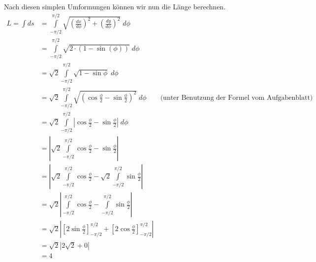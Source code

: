 \documentclass[a4paper,german,12pt,smallheadings]{scrartcl}
\begin{document}
\begin{enumerate}[a)]
    Nach diesen simplen Umformungen können wir nun die Länge berechnen.
    \begin{align*}
      L = \int ds &= \int\limits_{-\pi/2}^{\pi/2} \sqrt{\left(\frac{dx}{d\phi}\right)^2 + \left(\frac{dy}{d\phi}\right)^2} \; d\phi \\
              &= \int\limits_{-\pi/2}^{\pi/2} \sqrt{2\cdot(1- \sin(\phi))} \; d\phi \\
              &= \sqrt{2} \int\limits_{-\pi/2}^{\pi/2} \sqrt{1- \sin \phi} \; d\phi \\
              &= \sqrt{2} \int\limits_{-\pi/2}^{\pi/2} \sqrt{\left(\cos\frac{\phi}{2} - \sin\frac{\phi}{2}\right)^2} \; d\phi  \qquad \text{(unter Benutzung der Formel vom Aufgabenblatt)}\\
              &= \sqrt{2} \int\limits_{-\pi/2}^{\pi/2} \left|\cos\frac{\phi}{2} - \sin\frac{\phi}{2}\right| \; d\phi\\
              &= \left|\sqrt{2} \int\limits_{-\pi/2}^{\pi/2} \cos\frac{\phi}{2} - \sin\frac{\phi}{2}\right| \\
              &= \left|\sqrt{2} \int\limits_{-\pi/2}^{\pi/2} \cos\frac{\phi}{2} - \sqrt{2}\int\limits_{-\pi/2}^{\pi/2} \sin\frac{\phi}{2}\right| \\
              &= \sqrt{2} \left|\int\limits_{-\pi/2}^{\pi/2} \cos\frac{\phi}{2} - \int\limits_{-\pi/2}^{\pi/2} \sin\frac{\phi}{2}\right| \\
              &= \sqrt{2} \left|\left[2\sin \frac{\phi}{2}\right]_{-\pi/2}^{\pi/2} + \left[2\cos \frac{\phi}{2}\right]_{-\pi/2}^{\pi/2} \right| \\
              &= \sqrt{2} \left|2 \sqrt{2} + 0\right| \\
              &= 4
    \end{align*}

\end{enumerate}
\end{document}
